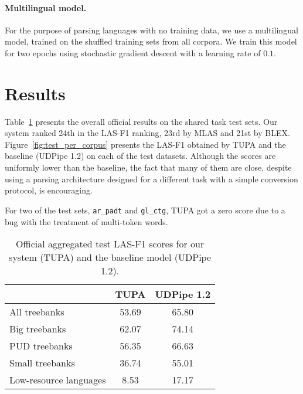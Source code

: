 \documentclass[11pt,a4paper]{article}
\begin{document}
\paragraph{Multilingual model.}

For the purpose of parsing languages with no training data,
we use a multilingual model, trained on the shuffled training sets
from all corpora.
We train this model for two epochs using stochastic gradient descent
with a learning rate of $0.1$.


\section{Results}\label{sec:results}


Table~\ref{tab:overall_results} presents the overall
official results on the shared task test sets.
Our system ranked 24th in the LAS-F1 ranking,
23rd by MLAS and 21st by BLEX.
Figure~\ref{fig:test_per_corpus} presents the LAS-F1
obtained by TUPA and the baseline (UDPipe 1.2) on each
of the test datasets.
Although the scores are uniformly lower than the baseline,
the fact that many of them are close, despite using a
parsing architecture designed for a different task
with a simple conversion protocol, is encouraging.

For two of the test sets, \verb|ar_padt| and \verb|gl_ctg|, TUPA got
a zero score due to a bug with the treatment of multi-token words.

\begin{table}
\begin{tabular}{lcc}
\hline
& \bf TUPA & \bf UDPipe 1.2 \\
\hline
All treebanks & 53.69 & 65.80 \\
Big treebanks & 62.07 & 74.14 \\
PUD treebanks & 56.35 & 66.63 \\
Small treebanks & 36.74 & 55.01 \\
Low-resource languages & 8.53 & 17.17
\end{tabular}
\caption{Official aggregated test LAS-F1 scores
for our system (TUPA) and the baseline model (UDPipe 1.2).
\label{tab:overall_results}}
\end{table}
\end{document}
